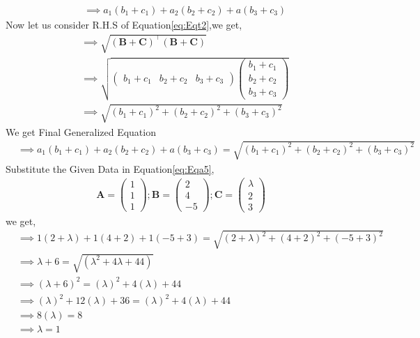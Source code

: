 \documentclass[10pt, a4paper]{article}
\newcommand{\myvec}[1]{\ensuremath{\begin{pmatrix}#1\end{pmatrix}}}
\let\vec\mathbf
\providecommand{\brak}[1]{\ensuremath{\left(#1\right)}}
\providecommand{\sbrak}[1]{\ensuremath{{}\left[#1\right]}}
\begin{document}
\begin{enumerate}
\begin{align}
   &\implies a_1(b_1+c_1)+a_2(b_2+c_2)+a(b_3+c_3)
\end{align}
Now let us consider R.H.S of Equation\eqref{eq:Eqt2},we get,
\begin{align}
    &\implies \sqrt{\brak{\vec{B}+\vec{C}}^\top\brak{\vec{B}+\vec{C}}}\\
    &\implies \sqrt{\myvec{b_1+c_1&b_2+c_2&b_3+c_3}\myvec{b_1+c_1\\b_2+c_2\\b_3+c_3}}\\
    &\implies \sqrt{\brak{b_1+c_1}^2+\brak{b_2+c_2}^2+\brak{b_3+c_3}^2}
\end{align}
We get Final Generalized Equation
\begin{align}
     &\implies a_1(b_1+c_1)+a_2(b_2+c_2)+a(b_3+c_3)= \sqrt{\brak{b_1+c_1}^2+\brak{b_2+c_2}^2+\brak{b_3+c_3}^2} \label{eq:Eqa5}
\end{align}
Substitute the Given Data in Equation\eqref{eq:Eqa5},
\begin{align*}
	\vec{A}=\myvec{1\\1\\1};\vec{B}=\myvec{2\\4\\-5};\vec{C}=\myvec{\lambda\\2\\3}
\end{align*}
we get,
\begin{align}   
&\implies 1\brak{2+\lambda}+1\brak{4+2}+1\brak{-5+3}=\sqrt{\brak{2+\lambda}^2+\brak{4+2}^2+\brak{-5+3}^2}\\
& \implies \lambda +6 = \sqrt{\brak{\lambda ^2+4 \lambda +44}}\\
& \implies\brak{ \lambda +6}^2 = \brak{\lambda} ^2+4 \brak{\lambda} +44\\
& \implies \brak{\lambda}^2+12\brak{ \lambda }+36 = \brak{ \lambda }^2+4 \brak{\lambda} +44\\
& \implies  8\brak{\lambda} = 8\\
 &\implies \lambda = 1
\end{align}
\end{enumerate}
\end{document}
